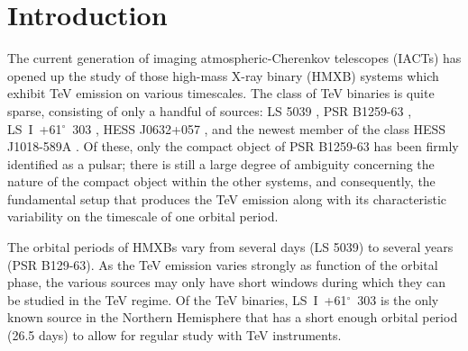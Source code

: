 \documentclass[preprint2]{aastex}
\newcommand{\lsi}{LS~I~+61$^{\circ}$~303}
\begin{document}
\keywords{}

\section{Introduction}

The current generation of imaging atmospheric-Cherenkov telescopes (IACTs) has opened up the study of those high-mass X-ray binary (HMXB) systems which exhibit TeV emission on various timescales. The class of TeV binaries is quite sparse, consisting of only a handful of sources: LS 5039 \citep{2005Sci...309..746A}, PSR B1259-63 \citep{2005A&A...442....1A}, \lsi{} \citep{Albert2006}, HESS J0632+057 \citep{2009ApJ...698L..94A}, and the newest member of the class HESS J1018-589A \citep{2015arXiv150302711H}. Of these, only the compact object of PSR B1259-63 has been firmly identified as a pulsar; there is still a large degree of ambiguity concerning the nature of the compact object within the other systems, and consequently, the fundamental setup that produces the TeV emission along with its characteristic variability on the timescale of one orbital period.



The orbital periods of HMXBs vary from several days (LS 5039) to several years (PSR B129-63). As the TeV emission varies strongly as function of the orbital phase, the various sources may only have short windows during which they can be studied in the TeV regime. Of the TeV binaries, \lsi{} is the only known source in the Northern Hemisphere that has a short enough orbital period (26.5 days) to allow for regular study with TeV instruments. 
\end{document}
